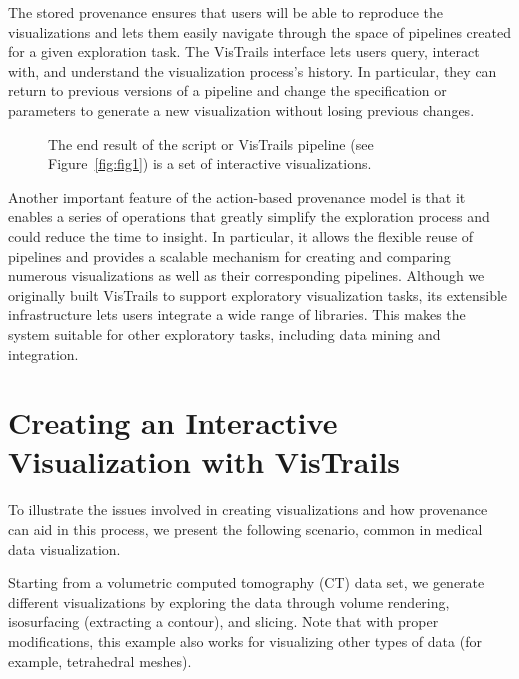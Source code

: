 \documentclass[11pt,twocolumn]{article}
\begin{document}
The stored provenance ensures that users will be able to
reproduce the visualizations and lets them easily navigate through the
space of pipelines created for a given exploration task. The VisTrails
interface lets users query, interact with, and understand the
visualization process’s history. In particular, they can return to
previous versions of a pipeline and change the specification or
parameters to generate a new visualization without losing previous
changes.  

\begin{figure}[t]
\caption{The end result of the script or VisTrails pipeline (see
  Figure~\ref{fig:fig1}) is a set of interactive visualizations.}
\label{fig:histogram_pdf}
\end{figure}

Another important feature of the action-based provenance model is that
it enables a series of operations that greatly simplify the
exploration process and could reduce the time to insight. In
particular, it allows the flexible reuse of pipelines and provides a
scalable mechanism for creating and comparing numerous visualizations
as well as their corresponding pipelines. Although we originally
built VisTrails to support exploratory visualization tasks, its
extensible infrastructure lets users integrate a wide range
of libraries. This makes the system suitable for other exploratory
tasks, including data mining and integration.  

\section{Creating an Interactive Visualization with VisTrails}
To illustrate the issues involved in creating visualizations and how
provenance can aid in this process, we present the following scenario,
common in medical data visualization.

Starting from a volumetric computed tomography (CT) data set, we
generate different visualizations by exploring the data through volume
rendering, isosurfacing (extracting a contour), and slicing. Note that
with proper modifications, this example also works for visualizing
other types of data (for example, tetrahedral meshes). 
\end{document}
